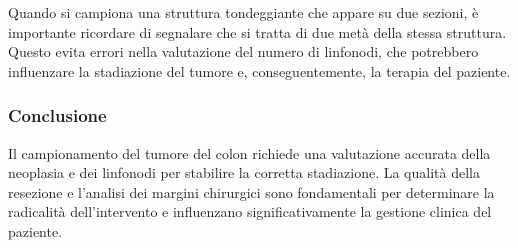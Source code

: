 Quando si campiona una struttura tondeggiante che appare su due sezioni, è importante ricordare di segnalare che si tratta di due metà della stessa struttura. Questo evita errori nella valutazione del numero di linfonodi, che potrebbero influenzare la stadiazione del tumore e, conseguentemente, la terapia del paziente.

\subsubsection{Conclusione}
Il campionamento del tumore del colon richiede una valutazione accurata della neoplasia e dei linfonodi per stabilire la corretta stadiazione. La qualità della resezione e l'analisi dei margini chirurgici sono fondamentali per determinare la radicalità dell'intervento e influenzano significativamente la gestione clinica del paziente.


